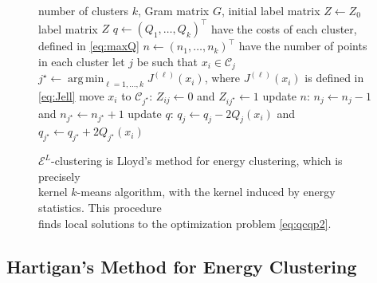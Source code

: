 \documentclass[aps,preprint,nofootinbib,floatfix]{revtex4-1}
\DeclareMathOperator*{\argmin}{arg\,min}
\newcommand\C{{\mathcal{C}}}
\begin{document}
\begin{figure}
\begin{flushleft}
\begin{algorithm}[H]
\vspace{.5em}
\begin{algorithmic}[1]
    \INPUT number of clusters $k$, Gram matrix $G$, initial label
    matrix $Z \leftarrow Z_0$
    \OUTPUT label matrix $Z$ 
  \STATE $q \leftarrow (Q_1, \dotsc, Q_k)^\top$ 
            have the costs of each cluster, defined in \eqref{eq:maxQ}
  \STATE $n \leftarrow (n_1,\dotsc,n_k)^\top$ 
        have the number of points in each cluster%
  \REPEAT
        \STATE let $j$ be such that $x_i \in \C_j$
        \STATE $j^\star \leftarrow \argmin_{\ell=1,\dotsc,k} J^{(\ell)}(x_i)$,
            where $J^{(\ell)}(x_i)$ is defined in \eqref{eq:Jell}
            \STATE move $x_i$ to $\C_{j^\star}$: $Z_{ij} \leftarrow 0$ and
            $Z_{ij^\star} \leftarrow 1$
            \STATE update $n$: $n_j \leftarrow n_j - 1$ and
                    $n_{j^\star} \leftarrow n_{j^\star} + 1$
            \STATE update $q$: $q_j \leftarrow q_j - 2Q_j(x_i)$ and
    $q_{j^\star} \leftarrow q_{j^\star} + 2Q_{j^\star}(x_i)$
        \ENDIF
    \ENDFOR
\end{algorithmic}
\caption{\label{kmeans_algo}
$\mathcal{E}^{L}$-clustering is Lloyd's method for energy clustering, which
is precisely~~~~~~~~~ \\
kernel $k$-means algorithm, with the kernel induced by energy statistics. 
This procedure~~~~~~~ \\
finds
local solutions to the optimization problem \eqref{eq:qcqp2}.\hspace{\fill}
}
\end{algorithm}
\end{flushleft}
\end{figure}

\subsection*{Hartigan's Method for Energy Clustering}
\end{document}
